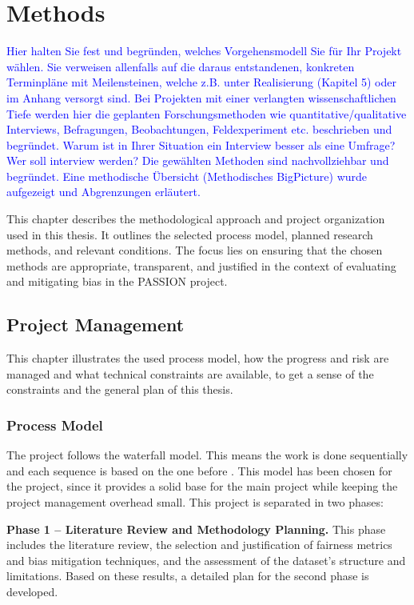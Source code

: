 \documentclass[12pt, a4paper, oneside]{book}   	%
\newcommand{\baaCriteria}[1]{\textcolor{blue}{#1}}
\begin{document}
	\chapter{Methods}\label{chap:methodology}
		\baaCriteria{Hier halten Sie fest und begründen, welches Vorgehensmodell Sie für Ihr Projekt wählen. Sie verweisen allenfalls auf die daraus entstandenen, konkreten Terminpläne mit Meilensteinen, welche z.B. unter Realisierung (Kapitel 5) oder im Anhang versorgt sind. Bei Projekten mit einer verlangten wissenschaftlichen Tiefe werden hier die geplanten Forschungsmethoden wie quantitative/qualitative Interviews, Befragungen, Beobachtungen, Feldexperiment etc. beschrieben und begründet. Warum ist in Ihrer Situation ein Interview besser als eine Umfrage? Wer soll interview werden?}
		\baaCriteria{Die gewählten Methoden sind nachvollziehbar und begründet. Eine methodische Übersicht (Methodisches BigPicture) wurde aufgezeigt und Abgrenzungen erläutert.}
		
		
		This chapter describes the methodological approach and project organization used in this thesis. It outlines the selected process model, planned research methods, and relevant conditions. The focus lies on ensuring that the chosen methods are appropriate, transparent, and justified in the context of evaluating and mitigating bias in the PASSION project.
		
		\section{Project Management}
		This chapter illustrates the used process model, how the progress and risk are managed and what technical constraints are available, to get a sense of the constraints and the general plan of this thesis. 
		
		\subsection{Process Model}
		The project follows the waterfall model. This means the work is done sequentially and each sequence is based on the one before \autocite{Petersen_2009}. This model has been chosen for the project, since it provides a solid base for the main project while keeping the project management overhead small.
		This project is separated in two phases:
		
		\textbf{Phase 1 – Literature Review and Methodology Planning.} This phase includes the literature review, the selection and justification of fairness metrics and bias mitigation techniques, and the assessment of the dataset's structure and limitations. Based on these results, a detailed plan for the second phase is developed.
		
\end{document}
